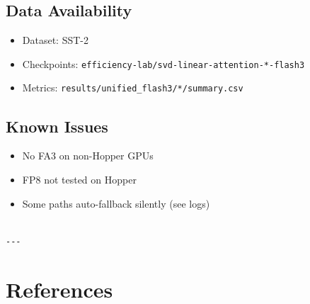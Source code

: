 \subsection{Data Availability}

\begin{itemize}
\item Dataset: SST-2
\item Checkpoints: \texttt{efficiency-lab/svd-linear-attention-*-flash3}
\item Metrics: \texttt{results/unified\_flash3/*/summary.csv}

\end{itemize}
\subsection{Known Issues}

\begin{itemize}
\item No FA3 on non-Hopper GPUs
\item FP8 not tested on Hopper
\item Some paths auto-fallback silently (see logs)
\end{itemize}
\begin{lstlisting}

---
\end{lstlisting}

\section{References}

